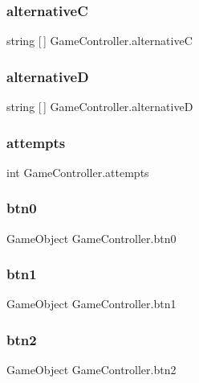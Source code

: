 \mbox{\label{class_game_controller_a8b54e533bb4b295881ea2be8b9d1d516}} 
\subsubsection{alternativeC}
{\footnotesize\ttfamily string [$\,$] Game\+Controller.\+alternativeC}

\mbox{\label{class_game_controller_a6dd8d5b841fb69efda307cfe8ab32a10}} 
\subsubsection{alternativeD}
{\footnotesize\ttfamily string [$\,$] Game\+Controller.\+alternativeD}

\mbox{\label{class_game_controller_ae17003d8112fdbcbf47399289af10774}} 
\subsubsection{attempts}
{\footnotesize\ttfamily int Game\+Controller.\+attempts}

\mbox{\label{class_game_controller_aaed180eef524ae3b5883970942ddfecc}} 
\subsubsection{btn0}
{\footnotesize\ttfamily Game\+Object Game\+Controller.\+btn0}

\mbox{\label{class_game_controller_a1bc3e8d4ea0d950dc0b38def86519b39}} 
\subsubsection{btn1}
{\footnotesize\ttfamily Game\+Object Game\+Controller.\+btn1}

\mbox{\label{class_game_controller_ac248d850b8f37888b01edf4c20552495}} 
\subsubsection{btn2}
{\footnotesize\ttfamily Game\+Object Game\+Controller.\+btn2}

